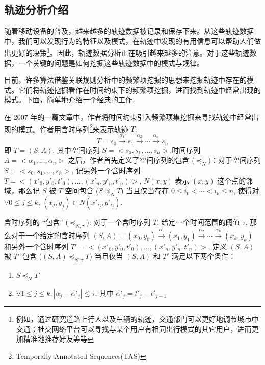 \subsection{轨迹分析介绍}
随着移动设备的普及，越来越多的轨迹数据被记录和保存下来。从这些轨迹数据中，我们可以发现行为的特征以及模式，在轨迹中发现的有用信息可以帮助人们做出更好的决策\footnote{例如，通过研究道路上行人以及车辆的轨迹，交通部门可以更好地调节城市中交通；社交网络平台可以寻找与某个用户有相同出行模式的其它用户，进而更加精准地推荐好友等等}。因此，轨迹数据分析正在吸引越来越多的注意。对于这些轨迹数据，一个关键的问题是如何挖掘这些轨迹数据中的模式与规律。\par
目前，许多算法借鉴关联规则分析中的频繁项挖掘的思想来挖掘轨迹中存在的模式。它们将轨迹挖掘看作在时间约束下的频繁项挖掘，进而找到轨迹中经常出现的模式。下面，简单地介绍一个经典的工作. \par
在 2007 年的一篇文章中，作者将时间约束引入频繁项集挖掘来寻找轨迹中经常出现的模式。作者用含时序列\footnote{Temporally Annotated Sequences(TAS)}来表示轨迹 $T$: 
\begin{equation*}
T = s_0 \xrightarrow{\alpha_1} s_1 \xrightarrow{\alpha_2} \cdots \xrightarrow{\alpha_n} s_n
\end{equation*}
即 $T=(S,A)$, 其中空间序列 $S=<s_0,s_1,\ldots,s_n>$,时间序列 $A=<\alpha_1, \ldots, \alpha_n>$ 
之后，作者首先定义了空间序列的包含 ($\preceq_N$)：对于空间序列 $S=<s_0,s_1,\ldots,s_n>$, 记另外一个含时序列 $T =<(x'_0,y'_0,t'_0),\ldots,(x'_n,y'_n,t'_n)>$, $N(x,y)$ 表示 $(x,y)$ 这个点的邻域，那么记 $S$ 被 $T$ 空间包含 ($S\preceq_N T$) 当且仅当存在 $0 \le i_0 < \cdots < i_k \le n$, 使得对 $\forall 0 \le j \le k$, $(x_j,y_j)\in N(x'_{i_j},y'_{i_j})$.

含时序列的 ``包含'' ($\preceq_{N,\tau}$): 对于一个含时序列 $T$, 给定一个时间范围的阈值 $\tau$, 那么对于一个给定的含时序列 $(S,A) = (x_0,y_0) \xrightarrow{\alpha_1} (x_1,y_1) \xrightarrow{\alpha_2} \cdots \xrightarrow{\alpha_n} (x_k,y_k)$ 和另外一个含时序列 $T' =<(x'_0,y'_0,t'_0),\ldots,(x'_n,y'_n,t'_n)>$, 定义 $(S,A)$ 被 $T'$ 包含 ($(S,A) \preceq_{N,\tau} T$) 当且仅当 $(S,A)$ 和 $T'$ 满足以下两个条件：
\begin{enumerate}
\item $S\preceq_N T'$
\item $\forall 1 \le j \le k, |\alpha_j-\alpha'_j| \le \tau$, 其中 $\alpha'_j = t'_j-t'_{j-1}$
\end{enumerate}

